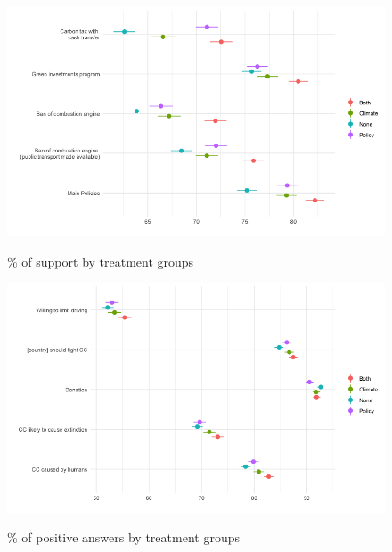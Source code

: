 \begin{frame}{}%
\begin{figure}[h!]
\caption{\% of support by treatment groups} %
\includegraphics[width=.7\paperwidth]{../figures/country_comparison/support_var_by_treatment_all.png} \\
\end{figure}
\end{frame}

\begin{frame}{}%
\begin{figure}[h!]
\caption{\% of positive answers by treatment groups} %
\includegraphics[width=.7\paperwidth]{../figures/country_comparison/attitudes_CC_by_country_all.png} \\
\end{figure}
\end{frame}


